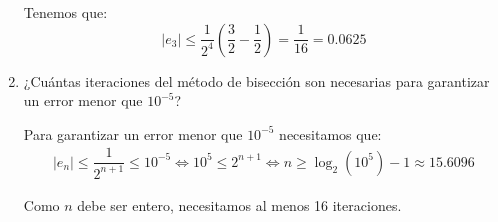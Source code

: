 \begin{ejercicio}
\begin{enumerate}
        

        Tenemos que:
        \begin{equation*}
            |e_3| \leq \dfrac{1}{2^{4}}\left(\dfrac{3}{2}-\dfrac{1}{2}\right)=\dfrac{1}{16}=0.0625
        \end{equation*}
        \item ¿Cuántas iteraciones del método de bisección son necesarias para garantizar un error menor que $10^{-5}$?
        
        Para garantizar un error menor que $10^{-5}$ necesitamos que:
        \begin{align*}
            |e_n| \leq \dfrac{1}{2^{n+1}}\leq 10^{-5} \iff 10^5\leq 2^{n+1}\iff n\geq \log_2(10^5)-1\approx 15.6096
        \end{align*}

        Como $n$ debe ser entero, necesitamos al menos 16 iteraciones.
    \end{enumerate}
\end{ejercicio}

